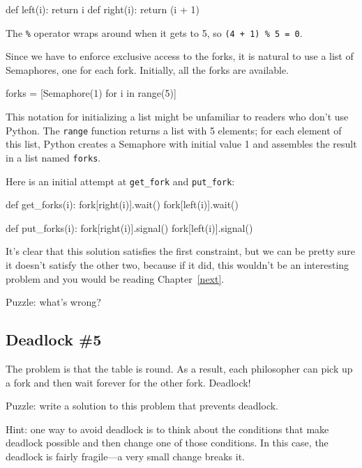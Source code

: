 \documentclass{book}
\begin{document}
\begin{unbreakable}[title={Which fork?}]{}
def left(i): return i
def right(i): return (i + 1) %
\end{unbreakable}

The {\tt \%} operator wraps around when it gets to 5, so
    {\tt (4 + 1) \% 5 = 0}.

Since we have to enforce exclusive access to the forks,
it is natural to use a list of Semaphores, one for
each fork.  Initially, all the forks are available.

\begin{unbreakable}[title={Variables for dining philosophers}]{}
forks = [Semaphore(1) for i in range(5)]
\end{unbreakable}

This notation for initializing a list might be unfamiliar to
readers who don't use Python.  The {\tt range} function returns
a list with 5 elements; for each element of this list, Python
creates a Semaphore with initial value 1 and assembles the
result in a list named {\tt forks}.

Here is an initial attempt at {\tt get\_fork} and {\tt put\_fork}:

\begin{unbreakable}[title={Dining philosophers non-solution}]{}
def get_forks(i):
    fork[right(i)].wait()
    fork[left(i)].wait()

def put_forks(i):
    fork[right(i)].signal()
    fork[left(i)].signal()
\end{unbreakable}

It's clear that this solution satisfies the first constraint, but
we can be pretty sure it doesn't satisfy the other two, because
if it did, this wouldn't be an interesting problem and you would
be reading Chapter~\ref{next}.

Puzzle: what's wrong?



\subsection{Deadlock \#5}

The problem is that the table is round.  As a result, each philosopher
can pick up a fork and then wait forever for the other fork.  Deadlock!

Puzzle: write a solution to this problem that prevents deadlock.

Hint: one way to avoid deadlock is to think about the conditions
that make deadlock possible and then change one of those conditions.
In this case, the deadlock is fairly fragile---a very small change
breaks it.
\end{document}
